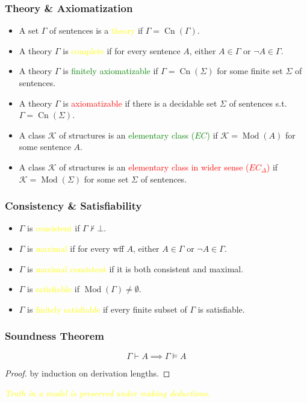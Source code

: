 \documentclass[UTF8,aspectratio=43,11pt,colorlinks,compress,openany]{beamer}%
\begin{document}
\begin{frame}\frametitle{Theory \& Axiomatization}
	\begin{itemize}
		\item A set $\Gamma$ of sentences is a \textcolor{yellow}{theory} if $\Gamma=\operatorname{Cn}(\Gamma)$.
		\item A theory $\Gamma$ is \textcolor{yellow}{complete} if for every sentence $A$, either $A\in\Gamma$ or $\neg A\in\Gamma$.
		\item A theory $\Gamma$ is \textcolor{green}{finitely axiomatizable} if $\Gamma=\operatorname{Cn}(\Sigma)$ for some finite set $\Sigma$ of sentences.
		\item A theory $\Gamma$ is \textcolor{red}{axiomatizable} if there is a decidable set $\Sigma$ of sentences s.t. $\Gamma=\operatorname{Cn}(\Sigma)$.
		\item A class $\mathcal{K}$ of structures is an \textcolor{green}{elementary class ($EC$)} if $\mathcal{K}=\operatorname{Mod}(A)$ for some sentence $A$.
		\item A class $\mathcal{K}$ of structures is an \textcolor{red}{elementary class in wider sense ($EC_\Delta$)} if $\mathcal{K}=\operatorname{Mod}(\Sigma)$ for some set $\Sigma$ of sentences.
	\end{itemize}
\end{frame}

\begin{frame}\frametitle{Consistency \& Satisfiability}
	\begin{itemize}
		\item $\Gamma$ is \textcolor{yellow}{consistent} if $\Gamma\nvdash\bot$.
		\item $\Gamma$ is \textcolor{yellow}{maximal} if for every wff $A$, either $A\in\Gamma$ or $\neg A\in\Gamma$.
		\item $\Gamma$ is \textcolor{yellow}{maximal consistent} if it is both consistent and maximal.
	\end{itemize}
	\begin{itemize}
		\item $\Gamma$ is \textcolor{yellow}{satisfiable} if $\operatorname{Mod}(\Gamma)\neq\emptyset$.
		\item $\Gamma$ is \textcolor{yellow}{finitely satisfiable} if every finite subset of $\Gamma$ is satisfiable.
	\end{itemize}
\end{frame}

\begin{frame}\frametitle{Soundness Theorem}
	\begin{theorem}
		\[\Gamma\vdash A\implies\Gamma\vDash A\]
	\end{theorem}
	\begin{proof}
		by induction on derivation lengths.
	\end{proof}
	\centering \emph{\textcolor{yellow}{Truth in a model is preserved under making deductions.}}
\end{frame}
\end{document}
